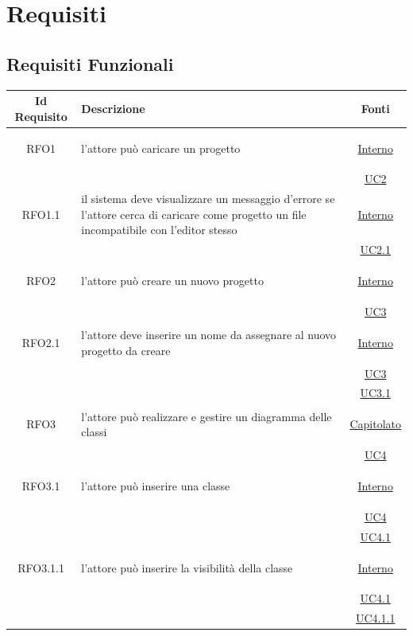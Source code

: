 
\section{Requisiti}

\subsection{Requisiti Funzionali}
\normalsize
\begin{longtable}{|c|>{\centering}m{7cm}|c|}
\hline
\textbf{Id Requisito} & \textbf{Descrizione} & \textbf{Fonti}\\
\hline
\endhead
\hypertarget{RFO1}{RFO1} & l'attore può caricare un progetto &  \hyperlink{Interno}{Interno}\\
& & \hyperref[UC2]{UC2}\\ \hline

\hypertarget{RFO1.1}{RFO1.1} & il sistema deve visualizzare un messaggio d'errore se l'attore cerca di caricare come progetto un file incompatibile con l'editor stesso &  \hyperlink{Interno}{Interno}\\
& & \hyperref[UC2.1]{UC2.1}\\ \hline

\hypertarget{RFO2}{RFO2} & l'attore può creare un nuovo progetto &  \hyperlink{Interno}{Interno}\\
& & \hyperref[UC3]{UC3}\\ \hline

\hypertarget{RFO2.1}{RFO2.1} & l'attore deve inserire un nome da assegnare al nuovo progetto da creare&  \hyperlink{Interno}{Interno}\\
& &\hyperref[UC3]{UC3}\\ 
& &\hyperref[UC3.1]{UC3.1}\\ \hline

\hypertarget{RFO3}{RFO3} & l'attore può realizzare e gestire un diagramma delle classi & \hyperlink{Capitolato}{Capitolato}\\
& & \hyperref[UC4]{UC4}\\ \hline

\hypertarget{RFO3.1}{RFO3.1} & l'attore può inserire una classe &  \hyperlink{Interno}{Interno}\\
& &\hyperref[UC4]{UC4}\\
& &\hyperref[UC4.1]{UC4.1}\\ \hline

\hypertarget{RFO3.1.1}{RFO3.1.1} & l'attore può inserire la visibilità della classe & \hyperlink{Interno}{Interno}\\
& &\hyperref[UC4.1]{UC4.1}\\
& &\hyperref[UC4.1.1]{UC4.1.1}\\ \hline


\end{longtable}
